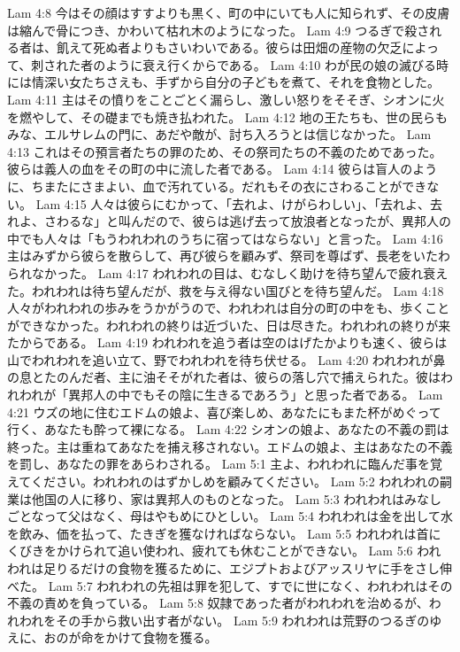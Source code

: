 Lam 4:8  今はその顔はすすよりも黒く、町の中にいても人に知られず、その皮膚は縮んで骨につき、かわいて枯れ木のようになった。
Lam 4:9  つるぎで殺される者は、飢えて死ぬ者よりもさいわいである。彼らは田畑の産物の欠乏によって、刺された者のように衰え行くからである。
Lam 4:10  わが民の娘の滅びる時には情深い女たちさえも、手ずから自分の子どもを煮て、それを食物とした。
Lam 4:11  主はその憤りをことごとく漏らし、激しい怒りをそそぎ、シオンに火を燃やして、その礎までも焼き払われた。
Lam 4:12  地の王たちも、世の民らもみな、エルサレムの門に、あだや敵が、討ち入ろうとは信じなかった。
Lam 4:13  これはその預言者たちの罪のため、その祭司たちの不義のためであった。彼らは義人の血をその町の中に流した者である。
Lam 4:14  彼らは盲人のように、ちまたにさまよい、血で汚れている。だれもその衣にさわることができない。
Lam 4:15  人々は彼らにむかって、「去れよ、けがらわしい」、「去れよ、去れよ、さわるな」と叫んだので、彼らは逃げ去って放浪者となったが、異邦人の中でも人々は「もうわれわれのうちに宿ってはならない」と言った。
Lam 4:16  主はみずから彼らを散らして、再び彼らを顧みず、祭司を尊ばず、長老をいたわられなかった。
Lam 4:17  われわれの目は、むなしく助けを待ち望んで疲れ衰えた。われわれは待ち望んだが、救を与え得ない国びとを待ち望んだ。
Lam 4:18  人々がわれわれの歩みをうかがうので、われわれは自分の町の中をも、歩くことができなかった。われわれの終りは近づいた、日は尽きた。われわれの終りが来たからである。
Lam 4:19  われわれを追う者は空のはげたかよりも速く、彼らは山でわれわれを追い立て、野でわれわれを待ち伏せる。
Lam 4:20  われわれが鼻の息とたのんだ者、主に油そそがれた者は、彼らの落し穴で捕えられた。彼はわれわれが「異邦人の中でもその陰に生きるであろう」と思った者である。
Lam 4:21  ウズの地に住むエドムの娘よ、喜び楽しめ、あなたにもまた杯がめぐって行く、あなたも酔って裸になる。
Lam 4:22  シオンの娘よ、あなたの不義の罰は終った。主は重ねてあなたを捕え移されない。エドムの娘よ、主はあなたの不義を罰し、あなたの罪をあらわされる。
Lam 5:1  主よ、われわれに臨んだ事を覚えてください。われわれのはずかしめを顧みてください。
Lam 5:2  われわれの嗣業は他国の人に移り、家は異邦人のものとなった。
Lam 5:3  われわれはみなしごとなって父はなく、母はやもめにひとしい。
Lam 5:4  われわれは金を出して水を飲み、価を払って、たきぎを獲なければならない。
Lam 5:5  われわれは首にくびきをかけられて追い使われ、疲れても休むことができない。
Lam 5:6  われわれは足りるだけの食物を獲るために、エジプトおよびアッスリヤに手をさし伸べた。
Lam 5:7  われわれの先祖は罪を犯して、すでに世になく、われわれはその不義の責めを負っている。
Lam 5:8  奴隷であった者がわれわれを治めるが、われわれをその手から救い出す者がない。
Lam 5:9  われわれは荒野のつるぎのゆえに、おのが命をかけて食物を獲る。
